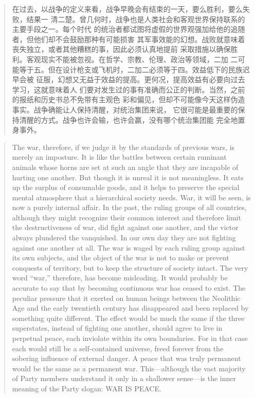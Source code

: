 \begin{paracol}{2}
\switchcolumn

\begin{quotation}
在过去，以战争的定义来看，战争早晚会有结束的一天，要么胜利，要么失败，结果一
清二楚。曾几何时，战争也是人类社会和客观世界保持联系的主要手段之一。每个时代
的统治者都试图将虚假的世界观强加给他的追随者，但他们却不会鼓励那种有可能损害
其军事效能的幻想。战败就意味着丧失独立，或者其他糟糕的事，因此必须认真地提前
采取措施以确保胜利。客观现实不能被忽视。在哲学、宗教、伦理、政治等领域，二加
二可能等于五。但在设计枪支或飞机时，二加二必须等于四。效益低下的民族迟早会被
征服，幻想又无益于效益的提高。更何况，提高效益有必要向过去学习，这就意味着人
们要对发生过的事有准确而公正的判断。当然，之前的报纸和历史书总不免带有主观色
彩和偏见，但却不可能像今天这样伪造事实。战争确能让人保持清醒，对统治集团来说，
它很可能是最重要的保持清醒的方式。战争也许会输，也许会赢，没有哪个统治集团能
完全地置身事外。
\end{quotation}

\switchcolumn*

\begin{quotation}
The war, therefore, if we judge it by the standards of previous wars, is
merely an imposture. It is like the battles between certain ruminant
animals whose horns are set at such an angle that they are incapable of
hurting one another. But though it is unreal it is not meaningless. It
eats up the surplus of consumable goods, and it helps to preserve the
special mental atmosphere that a hierarchical society needs. War, it
will be seen, is now a purely internal affair. In the past, the ruling
groups of all countries, although they might recognize their common
interest and therefore limit the destructiveness of war, did fight
against one another, and the victor always plundered the vanquished. In
our own day they are not fighting against one another at all. The war is
waged by each ruling group against its own subjects, and the object of
the war is not to make or prevent conquests of territory, but to keep
the structure of society intact. The very word ``war,'' therefore, has
become misleading. It would probably be accurate to say that by becoming
continuous war has ceased to exist. The peculiar pressure that it
exerted on human beings between the Neolithic Age and the early
twentieth century has disappeared and been replaced by something quite
different. The effect would be much the same if the three superstates,
instead of fighting one another, should agree to live in perpetual
peace, each inviolate within its own boundaries. For in that case each
would still be a self-contained universe, freed forever from the
sobering influence of external danger. A peace that was truly permanent
would be the same as a permanent war. This---although the vast majority
of Party members understand it only in a shallower sense---is the inner
meaning of the Party slogan: \textsc{WAR IS PEACE}.
\end{quotation}


\end{paracol}
